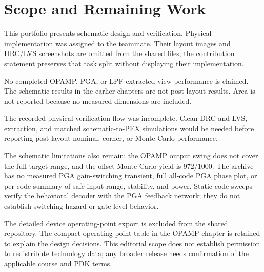 \chapter{Scope and Remaining Work}

This portfolio presents schematic design and verification. Physical implementation was assigned to the teammate. Their layout images and DRC/LVS screenshots are omitted from the shared files; the contribution statement preserves that task split without displaying their implementation.

No completed OPAMP, PGA, or LPF extracted-view performance is claimed. The schematic results in the earlier chapters are not post-layout results. Area is not reported because no measured dimensions are included.

The recorded physical-verification flow was incomplete. Clean DRC and LVS, extraction, and matched schematic-to-PEX simulations would be needed before reporting post-layout nominal, corner, or Monte Carlo performance.

The schematic limitations also remain: the OPAMP output swing does not cover the full target range, and the offset Monte Carlo yield is 972/1000. The archive has no measured PGA gain-switching transient, full all-code PGA phase plot, or per-code summary of safe input range, stability, and power. Static code sweeps verify the behavioral decoder with the PGA feedback network; they do not establish switching-hazard or gate-level behavior.

The detailed device operating-point export is excluded from the shared repository. The compact operating-point table in the OPAMP chapter is retained to explain the design decisions. This editorial scope does not establish permission to redistribute technology data; any broader release needs confirmation of the applicable course and PDK terms.
